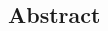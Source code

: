 
\renewcommand{\title}[1]{\chapter{#1}}
\renewcommand{\author}[2][]{{\Gotham\large{#2\textsuperscript{#1}}~~}}

\renewcommand{\affil}[2][]{{\noindent\footnotesize{#1}~~#2 \\}}

\patchcmd{\thebibliography}{\chapter*}{\section*}{}{}

\begin{spacing}{1}



\section*{Abstract}



\end{spacing}

\newpage



\begin{spacing}{1}





\end{spacing}

